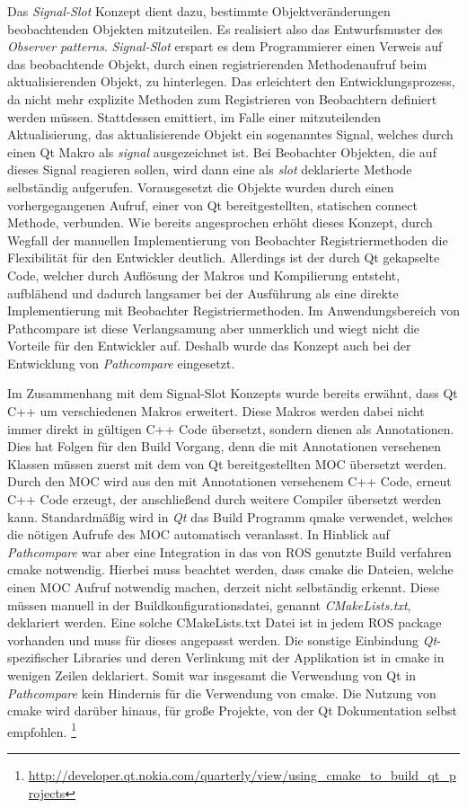 Das \textit{Signal-Slot} Konzept dient dazu, bestimmte Objektveränderungen
beobachtenden Objekten mitzuteilen.  Es realisiert also das Entwurfsmuster des
\textit{Observer patterns}. \textit{Signal-Slot} erspart es dem Programmierer
einen Verweis auf das beobachtende Objekt, durch einen registrierenden
Methodenaufruf beim aktualisierenden Objekt, zu hinterlegen.  Das erleichtert
den Entwicklungsprozess, da nicht mehr explizite Methoden zum Registrieren von
Beobachtern definiert werden müssen. Stattdessen emittiert, im Falle einer
mitzuteilenden Aktualisierung, das aktualisierende Objekt ein sogenanntes
Signal, welches durch einen Qt Makro als \textit{signal} ausgezeichnet ist. Bei
Beobachter Objekten, die auf dieses Signal reagieren sollen, wird dann eine als
\textit{slot} deklarierte Methode selbständig aufgerufen. Vorausgesetzt die
Objekte wurden durch einen vorhergegangenen Aufruf, einer von Qt
bereitgestellten, statischen connect Methode, verbunden. Wie bereits
angesprochen erhöht dieses Konzept, durch Wegfall der manuellen Implementierung
von Beobachter Registriermethoden die Flexibilität für den Entwickler deutlich.
Allerdings ist der durch Qt gekapselte Code, welcher durch Auflösung der Makros
und Kompilierung entsteht, aufblähend und dadurch langsamer bei der Ausführung
als eine direkte Implementierung mit Beobachter Registriermethoden. Im
Anwendungsbereich von Pathcompare ist diese Verlangsamung aber unmerklich und
wiegt nicht die Vorteile für den Entwickler auf. Deshalb wurde das Konzept auch
bei der Entwicklung von \textit{Pathcompare} eingesetzt. 

Im Zusammenhang mit dem Signal-Slot Konzepts wurde bereits erwähnt, dass Qt C++
um verschiedenen Makros erweitert. Diese Makros werden dabei nicht immer direkt
in gültigen C++ Code übersetzt, sondern dienen als Annotationen. Dies hat
Folgen für den Build Vorgang, denn die mit Annotationen versehenen Klassen
müssen zuerst mit dem von Qt bereitgestellten \gls{MOC} übersetzt werden.
Durch den MOC wird aus den mit Annotationen versehenem C++ Code, erneut C++
Code erzeugt, der anschließend durch weitere Compiler übersetzt werden kann.
Standardmäßig wird in \textit{Qt} das Build Programm qmake verwendet, welches
die nötigen Aufrufe des \gls{MOC} automatisch veranlasst. In Hinblick auf
\textit{Pathcompare} war aber eine Integration in das von ROS genutzte Build
verfahren cmake notwendig. Hierbei muss beachtet werden, dass cmake die
Dateien, welche einen \gls{MOC} Aufruf notwendig machen, derzeit nicht
selbständig erkennt. Diese müssen manuell in der Buildkonfigurationsdatei,
genannt \textit{CMakeLists.txt}, deklariert werden.  Eine solche CMakeLists.txt
Datei ist in jedem ROS package vorhanden und muss für dieses angepasst werden.
Die sonstige Einbindung \textit{Qt}-spezifischer Libraries und deren Verlinkung
mit der Applikation ist in cmake in wenigen Zeilen deklariert. Somit war
insgesamt die Verwendung von Qt in \textit{Pathcompare} kein Hindernis für die
Verwendung von cmake. Die Nutzung von cmake wird darüber hinaus, für große
Projekte, von der Qt Dokumentation selbst empfohlen.
\footnote{\url{http://developer.qt.nokia.com/quarterly/view/using_cmake_to_build_qt_projects}}

